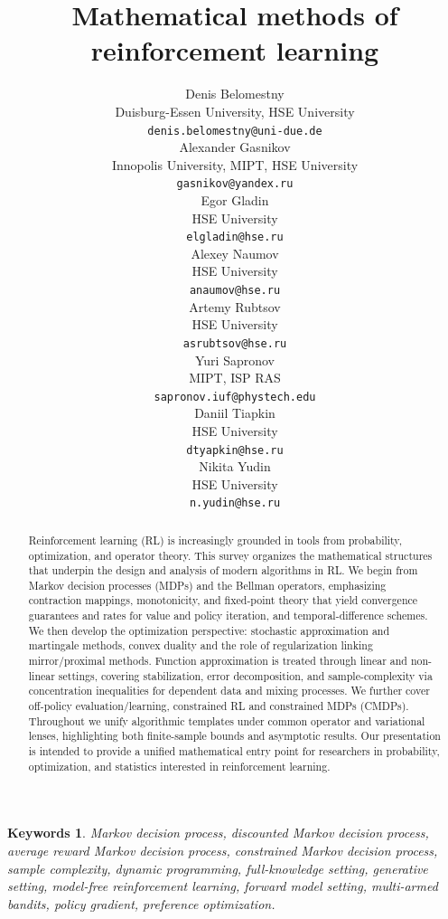 \documentclass{article}
\title{Mathematical methods of reinforcement learning}
\author{
Denis Belomestny\\
Duisburg-Essen University, HSE University\\
\texttt{denis.belomestny@uni-due.de}\\
\And
Alexander Gasnikov\\
Innopolis University, MIPT, HSE University\\
\texttt{gasnikov@yandex.ru}\\
\And
Egor Gladin\\
HSE University\\
\texttt{elgladin@hse.ru}\\
\And
Alexey Naumov\\
HSE University\\
\texttt{anaumov@hse.ru}\\
\And
Artemy Rubtsov\\
HSE University\\
\texttt{asrubtsov@hse.ru}\\
\And
Yuri Sapronov\\
MIPT, ISP RAS\\
\texttt{sapronov.iuf@phystech.edu}\\
\And
Daniil Tiapkin\\
HSE University\\
\texttt{dtyapkin@hse.ru}\\
\And
Nikita Yudin\\
HSE University\\
\texttt{n.yudin@hse.ru}\\
}
\numberwithin{equation}{section}
\newtheorem*{keywords*}{Keywords}
\begin{document}
\maketitle

\begin{abstract}

Reinforcement learning (RL) is increasingly grounded in tools from probability, optimization, and operator theory. This survey organizes the mathematical structures  that underpin the design and analysis of modern algorithms in RL. We begin from Markov decision processes (MDPs) and the Bellman operators, emphasizing contraction mappings, monotonicity, and fixed-point theory that yield  convergence guarantees and rates for value and policy iteration, and temporal-difference schemes. We then develop the optimization  perspective: stochastic approximation and martingale methods, convex duality and the role of regularization linking mirror/proximal methods. Function approximation is treated through linear and non-linear settings, covering stabilization, error decomposition, and sample-complexity via concentration inequalities for dependent data and mixing processes. We further cover off-policy evaluation/learning, constrained RL and constrained MDPs (CMDPs). Throughout we unify algorithmic templates under common operator and variational lenses, highlighting both finite-sample bounds and asymptotic results. Our presentation is intended to provide a unified mathematical entry point for researchers in probability, optimization, and statistics interested in reinforcement learning.

\end{abstract}

\begin{keywords*}
Markov decision process, discounted Markov decision process, average reward Markov decision process, constrained Markov decision process, sample complexity, dynamic programming, full-knowledge setting, generative setting, model-free reinforcement learning, forward model setting, multi-armed bandits, policy gradient, preference optimization.
\end{keywords*}
\end{document}
